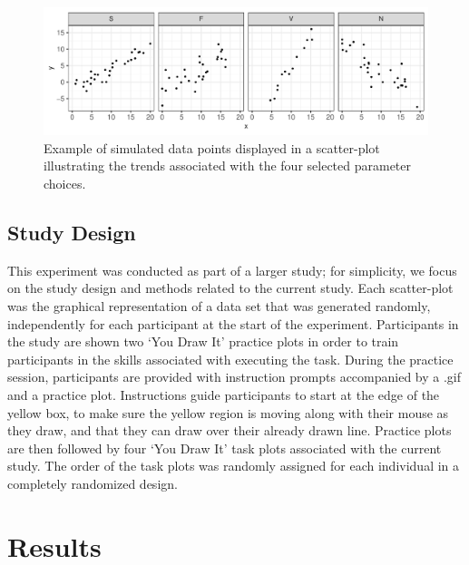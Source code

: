 \documentclass[12pt]{article}
\begin{document}
\begin{figure}[tbp]

{\centering \includegraphics[width=1\linewidth,]{Eye-Fitting-Straight-Lines-in-the-Modern-Era_files/figure-latex/eyefitting-simplot-1} 

}

\caption{Example of simulated data points displayed in a scatter-plot illustrating the trends associated with the four selected parameter choices.}\label{fig:eyefitting-simplot}
\end{figure}

\hypertarget{study-design}{%
\subsection{Study Design}\label{study-design}}

This experiment was conducted as part of a larger study; for simplicity,
we focus on the study design and methods related to the current study.
Each scatter-plot was the graphical representation of a data set that
was generated randomly, independently for each participant at the start
of the experiment. Participants in the study are shown two `You Draw It'
practice plots in order to train participants in the skills associated
with executing the task. During the practice session, participants are
provided with instruction prompts accompanied by a .gif and a practice
plot. Instructions guide participants to start at the edge of the yellow
box, to make sure the yellow region is moving along with their mouse as
they draw, and that they can draw over their already drawn line.
Practice plots are then followed by four `You Draw It' task plots
associated with the current study. The order of the task plots was
randomly assigned for each individual in a completely randomized design.

\hypertarget{results}{%
\section{Results}\label{results}}
\end{document}
